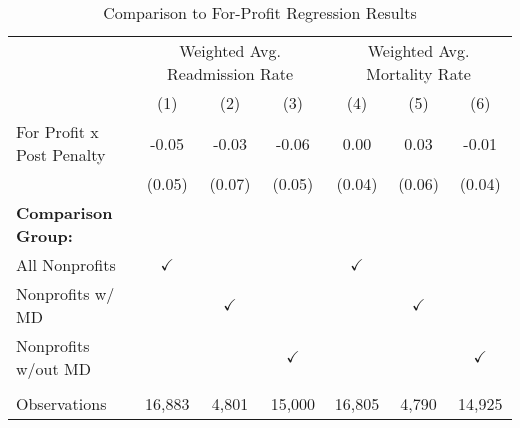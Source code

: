 \begin{table}[htbp]
   \caption{\label{tab:forprofit_fullsample} Comparison to For-Profit Regression Results}
   \bigskip
   \centering
   \begin{tabular}{lcccccc}
      \toprule
       & \multicolumn{3}{c}{Weighted Avg. Readmission Rate} & \multicolumn{3}{c}{Weighted Avg. Mortality Rate}\\
                                  & (1)           & (2)           & (3)           & (4)           & (5)           & (6)\\  
      \midrule 
      For Profit x Post Penalty   & -0.05         & -0.03         & -0.06         & 0.00          & 0.03          & -0.01\\   
                                  & (0.05)        & (0.07)        & (0.05)        & (0.04)        & (0.06)        & (0.04)\\   
      \textbf{Comparison Group:}  &               &               &               &               &               & \\  
      All Nonprofits              & $\checkmark$  &               &               & $\checkmark$  &               & \\  
      Nonprofits w/ MD            &               & $\checkmark$  &               &               & $\checkmark$  & \\  
      Nonprofits w/out MD         &               &               & $\checkmark$  &               &               & $\checkmark$\\   
       \\
      Observations                & 16,883        & 4,801         & 15,000        & 16,805        & 4,790         & 14,925\\  
      \bottomrule
   \end{tabular}
\end{table}

